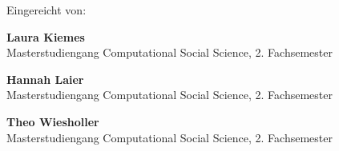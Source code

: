 \begin{titlepage}

\vspace{1.25cm}

\begin{flushleft}
\small
Eingereicht von:

\vspace{0.15cm}

\textbf{Laura Kiemes}\\
Masterstudiengang Computational Social Science, 2. Fachsemester
\ifx\LauraAddress\empty
\else
\\
\LauraAddress
\fi

\vspace{0.15cm}

\textbf{Hannah Laier}\\
Masterstudiengang Computational Social Science, 2. Fachsemester
\ifx\HannahAddress\empty
\else
\\
\HannahAddress
\fi

\vspace{0.15cm}

\textbf{Theo Wiesholler}\\
Masterstudiengang Computational Social Science, 2. Fachsemester
\ifx\TheoAddress\empty
\else
\\
\TheoAddress
\fi
\end{flushleft}

\end{titlepage}

\clearpage
